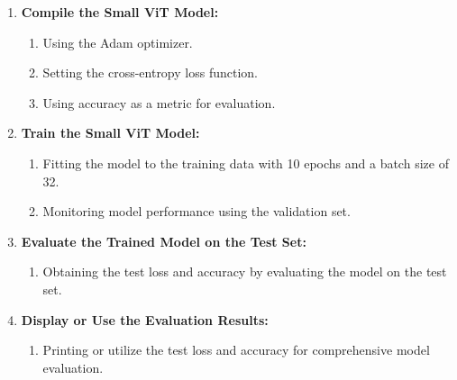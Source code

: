 \begin{enumerate}
    \item \textbf{Compile the Small ViT Model:}
          \begin{enumerate}
             \item Using the Adam optimizer.
             \item Setting the cross-entropy loss function.
             \item Using accuracy as a metric for evaluation.
          \end{enumerate}
 
    \item \textbf{Train the Small ViT Model:}
          \begin{enumerate}
             \item Fitting the model to the training data with 10 epochs and a batch size of 32.
             \item Monitoring model performance using the validation set.
          \end{enumerate}
 
    \item \textbf{Evaluate the Trained Model on the Test Set:}
          \begin{enumerate}
             \item Obtaining the test loss and accuracy by evaluating the model on the test set.
          \end{enumerate}
 
    \item \textbf{Display or Use the Evaluation Results:}
          \begin{enumerate}
             \item Printing or utilize the test loss and accuracy for comprehensive model evaluation.
          \end{enumerate}
 \end{enumerate}
 



